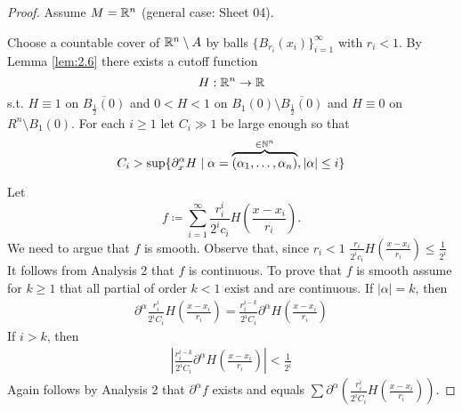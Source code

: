  \begin{proof}
    Assume \(M=\mathbb{R}^n\) (general case: Sheet 04).

    Choose a countable cover of \(\mathbb{R}^n\setminus A\) by balls \(\{B_{r_i}(x_i)\}_{i=1}^\infty\) with \(r_i<1\).
    By Lemma \ref{lem:2.6} there exists a cutoff function \[H:\mathbb{R}^n\to \mathbb{R}\]
    s.t. \(H\equiv 1\) on \(\overline{B_{\frac{1}{2}}(0)}\) and \(0<H<1\) on \(B_1(0)\setminus \overline{B_{\frac{1}{2}}(0)}\)
    and \(H\equiv 0\) on \(R^n\setminus B_1(0)\). For each \(i\geq 1\) let \(C_i\gg 1\) be large enough so that 
    \[C_i>\sup \{\partial^\alpha_x H \mid \alpha=\overbrace{(\alpha_1,\dots,\alpha_n)}^{\in \mathbb{N}^n},|\alpha|\leq i\}\]  

    Let \[f\coloneqq \sum_{i=1}^\infty \frac{r_i^i}{2^i c_i}H\left(\frac{x-x_i}{r_i}\right).\]
    We need to argue that \(f\) is smooth. Observe that, since \(r_i<1\) \(\frac{r_i}{2^ic_i}H\left(\frac{x-x_i}{r_i}\right)\leq \frac{1}{2^i}\)
    It follows from Analysis 2 that \(f\) is continuous. To prove that \(f\) is smooth assume for \(k\geq 1\)  
    that all partial of order \(k<1\) exist and are continuous. If \(|\alpha|=k\), then \begin{align*}
        \partial^\alpha\frac{r_i^i}{2^iC_i} H\left(\frac{x-x_i}{r_i}\right)=\frac{r_i^{i-k}}{2^iC_i}\partial^\alpha H \left(\frac{x-x_i}{r_i}\right)
    \end{align*}
    If \(i>k\), then 
    \begin{align*}
        \left\vert \frac{r_i^{i-k}}{2^iC_i} \partial^\alpha  H \left(\frac{x-x_i}{r_i}\right)\right\vert<\frac{1}{2^i}
    \end{align*}
    Again follows by Analysis 2 that \(\partial^\alpha f\) exists and equals \(\sum\partial^\alpha \left(\frac{r_i^i}{2^iC_i}H\left(\frac{x-x_i}{r_i}\right) \right)\).
\end{proof}

